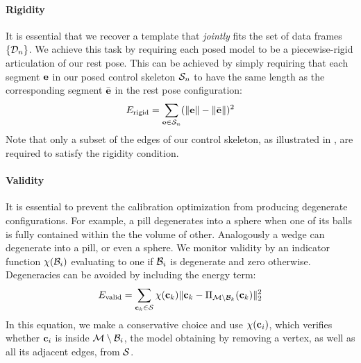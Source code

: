 \paragraph{Rigidity}
It is essential that we recover a template that \emph{jointly} fits the set of data frames $\{ \mathcal{D}_n \}$. We achieve this task by requiring each posed model to be a piecewise-rigid articulation of our rest pose. This can be achieved by simply requiring that each segment $\mathbf{e}$ in our posed control skeleton $\skeleton_n$ to have the same length as the corresponding segment $\bar{\mathbf{e}}$ in the rest pose configuration:
% 
\begin{equation}
E_{\text{rigid}} = \sum_{\mathbf{e} \in \mathcal{S}_n} (\| \mathbf{e} \| - \| \bar{\mathbf{e}} \|)^2
\end{equation}
% 
Note that only a subset of the edges of our control skeleton, as illustrated in , are required to satisfy the rigidity condition.

\paragraph{Validity}
It is essential to prevent the calibration optimization from producing degenerate configurations. For example, a pill degenerates into a sphere when one of its balls is fully contained within the the volume of other. Analogously a wedge can degenerate into a pill, or even a sphere. We monitor validity by an indicator function $\chi(\mathcal{B}_i)$ evaluating to one if $\mathcal{B}_i$ is degenerate and zero otherwise.
Degeneracies can be avoided by including the energy term:
% 
\begin{equation}
E_{\text{valid}} = \sum_{\mathbf{c}_k \in \mathcal{S}} \chi(\mathbf{c}_k) \| \mathbf{c}_k - \Pi_{\mathcal{M} \setminus \mathcal{B}_k}(\mathbf{c}_k) \|_2^2
\end{equation}
% 
In this equation, we make a conservative choice and use $\chi(\mathbf{c}_i)$, which verifies whether $\mathbf{c}_i$ is inside $\mathcal{M} \setminus \mathcal{B}_i$, the model obtaining by removing a vertex, as well as all its adjacent edges, from $\mathcal{S}$. 

\endinput

\paragraph{Rigidity - OLD}
\begin{DRAFT}
We encode this requirement by requiring each edge $\edge_k$ in each posed skeleton $\skeleton_n$ to be a rotation of rotation $R_{k}$ of its rest-pose configuration~$\bar\edge_k$: 
\begin{equation}
E_{\text{rigid}} = \sum_{\edge_k \in \skeleton_n} \| \edge_k  - R_{k}{\bar\edge_k} \|_2^2
\label{eq:rigidity}
\end{equation} 
Note that only a subset of the edges of our control skeleton, as illustrated in \Figure{topology}, are required to satisfy this rigidity requirement. At the cost of introducing auxiliary variables $R_{i}$, this energy becomes independent from pose $\parposes$ and posture $\parposture$ angles.
\end{DRAFT}


